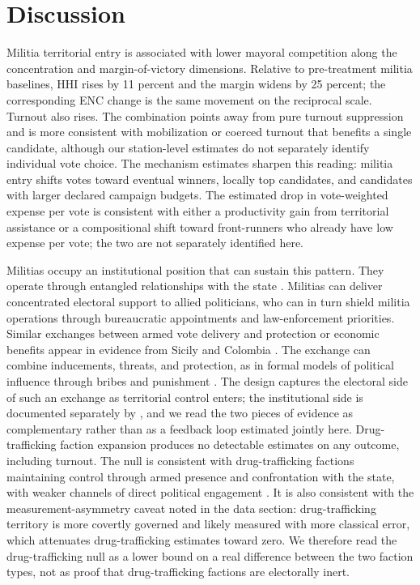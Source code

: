\documentclass[11pt]{article}
\begin{document}
\section{Discussion}\label{sec:discussion}

Militia territorial entry is associated with lower mayoral competition along the concentration and margin-of-victory dimensions. Relative to pre-treatment militia baselines, HHI rises by 11 percent and the margin widens by 25 percent; the corresponding ENC change is the same movement on the reciprocal scale. Turnout also rises. The combination points away from pure turnout suppression and is more consistent with mobilization or coerced turnout that benefits a single candidate, although our station-level estimates do not separately identify individual vote choice. The mechanism estimates sharpen this reading: militia entry shifts votes toward eventual winners, locally top candidates, and candidates with larger declared campaign budgets. The estimated drop in vote-weighted expense per vote is consistent with either a productivity gain from territorial assistance or a compositional shift toward front-runners who already have low expense per vote; the two are not separately identified here.

Militias occupy an institutional position that can sustain this pattern. They operate through entangled relationships with the state \citep{pantaleao2025elections}. Militias can deliver concentrated electoral support to allied politicians, who can in turn shield militia operations through bureaucratic appointments and law-enforcement priorities. Similar exchanges between armed vote delivery and protection or economic benefits appear in evidence from Sicily and Colombia \citep{defeo2017mafia, acemoglu2013monopoly}. The exchange can combine inducements, threats, and protection, as in formal models of political influence through bribes and punishment \citep{dalbo2006plata}. The design captures the electoral side of such an exchange as territorial control enters; the institutional side is documented separately by \citet{pantaleao2025elections}, and we read the two pieces of evidence as complementary rather than as a feedback loop estimated jointly here. Drug-trafficking faction expansion produces no detectable estimates on any outcome, including turnout. The null is consistent with drug-trafficking factions maintaining control through armed presence and confrontation with the state, with weaker channels of direct political engagement \citep{arias2006drugs, barnes2022territorial}. It is also consistent with the measurement-asymmetry caveat noted in the data section: drug-trafficking territory is more covertly governed and likely measured with more classical error, which attenuates drug-trafficking estimates toward zero. We therefore read the drug-trafficking null as a lower bound on a real difference between the two faction types, not as proof that drug-trafficking factions are electorally inert.
\end{document}
